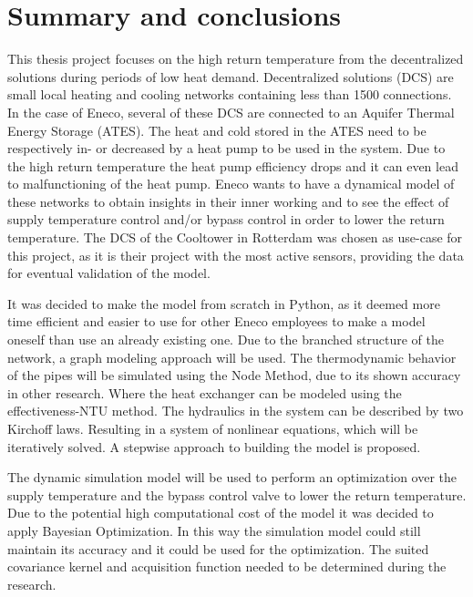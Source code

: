 \chapter{Summary and conclusions}
This thesis project focuses on the high return temperature from the decentralized solutions
during periods of low heat demand. Decentralized solutions (DCS) are small local heating and cooling networks containing less than 1500 connections. In the case of Eneco, several of these DCS are connected to an Aquifer Thermal Energy Storage (ATES). The heat and cold stored in the ATES need to be respectively in- or decreased by a heat pump to be used in the system. Due to the high return temperature the heat pump efficiency drops and it can even lead to malfunctioning of the heat pump. Eneco wants to have a dynamical model of these networks to obtain insights in their inner working and to see the effect of supply temperature control and/or bypass control in order to lower the return temperature. The DCS of the Cooltower in Rotterdam was chosen as use-case for this project, as it is their project with the most active sensors, providing the data for eventual validation of the model. 

It was decided to make the model from scratch in Python, as it deemed more time efficient and easier to use for other Eneco employees to make a model oneself than use an already existing one. Due to the branched structure of the network, a graph modeling approach will be used. The thermodynamic behavior of the pipes will be simulated using the Node Method, due to its shown accuracy in other research. Where the heat exchanger can be modeled using the effectiveness-NTU method. The hydraulics in the system can be described by two Kirchoff laws. Resulting in a system of nonlinear equations, which will be iteratively solved. A stepwise approach to building the model is proposed.

The dynamic simulation model will be used to perform an optimization over the supply temperature and the bypass control valve to lower the return temperature. Due to the potential high computational cost of the model it was decided to apply Bayesian Optimization. In this way the simulation model could still maintain its accuracy and it could be used for the optimization. The suited covariance kernel and acquisition function needed to be determined during the research. 


